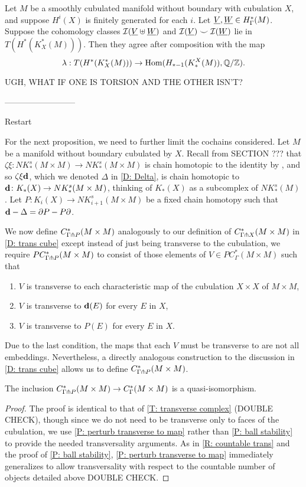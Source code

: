\documentclass{amsart}
\begin{document}
\begin{proposition}
Let $M$ be a smoothly cubulated manifold without boundary with cubulation $X$, and suppose $H^i(X)$ is finitely generated for each $i$. Let $\underline{V},\underline{W}\in H^*_\Gamma(M)$. Suppose the cohomology classes $\mathcal{I}(\underline{V}\uplus\underline{W})$ and $\mathcal{I}(\underline{V}) \smile \mathcal{I}(\underline{W})$ lie in $T(H^*(K_X^*(M)))$. Then they agree after composition with the map $$\lambda:T(H^*(K_X^*(M)))\to \textup{Hom}(H_{*-1}(K_*^X(M)),\mathbb{Q}/\mathbb{Z}).$$
\end{proposition}

UGH, WHAT IF ONE IS TORSION AND THE OTHER ISN'T?

--------------------------

Restart

For the next proposition, we need to further limit the cochains considered.
Let $M$ be a manifold without boundary cubulated by $X$.
Recall from SECTION ??? that $\zeta \xi \colon NK^s_*(M \times M) \to  NK^s_*(M \times M)$ is chain homotopic to the identity by \cite[Section XI.5]{Mas91}, and so $\zeta\xi \mathbf{d}$, which we denoted $\Delta$ in \cref{D: Delta}, is chain homotopic to $\mathbf{d} \colon K_*(X) \to NK^s_*(M \times M)$, thinking of $K_*(X)$ as a subcomplex of $NK_*^s(M)$.
Let $P \colon K_i(X) \to NK^s_{i+1}(M \times M)$ be a fixed chain homotopy such that $\mathbf{d} - \Delta = \partial P - P \partial$.

We now define $C^*_{\Gamma \pitchfork P} (M \times M)$ analogously to our definition of $C^*_{\Gamma \pitchfork X}(M \times M)$ in \cref{D: trans cube} except instead of just being transverse to the cubulation, we require
$PC^*_{\Gamma \pitchfork P} (M \times M)$ to consist of those elements of $V \in PC^*_{\Gamma}(M \times M)$ such that
\begin{enumerate}
\item $V$ is transverse to each characteristic map of the cubulation $X \times X$ of $M \times M$,
\item $V$ is transverse to $\mathbf{d}(E)$ for every $E$ in $X$,
\item $V$ is transverse to $P(E)$ for every $E$ in $X$.
\end{enumerate}

Due to the last condition, the maps that each $V$ must be transverse to are not all embeddings.
Nevertheless, a directly analogous construction to the discussion in \cref{D: trans cube} allows us to define $C^*_{\Gamma \pitchfork P} (M \times M)$.

\begin{lemma}
	The inclusion $C^*_{\Gamma \pitchfork P} (M \times M) \to C^*_\Gamma (M \times M)$ is a quasi-isomorphism.
\end{lemma}
\begin{proof}
The proof is identical to that of \cref{T: transverse complex} (DOUBLE CHECK), though since we do not need to be transverse only to faces of the cubulation, we use \cref{P: perturb transverse to map} rather than \cref{P: ball stability} to provide the needed transversality arguments.
As in \cref{R: countable trans} and the proof of \cref{P: ball stability}, \cref{P: perturb transverse to map} immediately generalizes to allow transversality with respect to the countable number of objects detailed above DOUBLE CHECK.
\end{proof}
\end{document}
